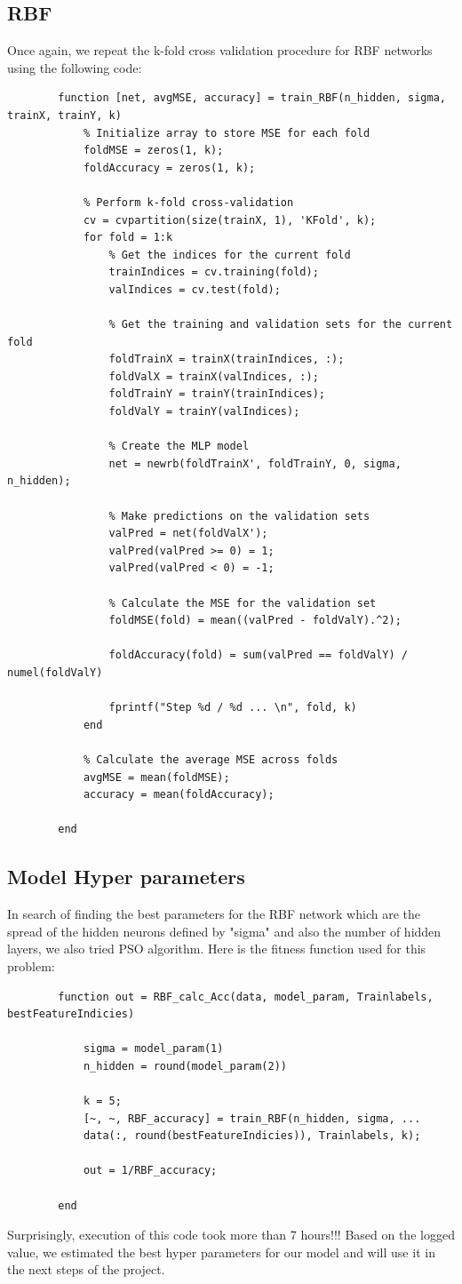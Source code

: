 \documentclass[]{article}
\begin{document}
	\subsection{RBF}
	Once again, we repeat the k-fold cross validation procedure for RBF networks using the following code:
	\begin{lstlisting}
		function [net, avgMSE, accuracy] = train_RBF(n_hidden, sigma, trainX, trainY, k)
			% Initialize array to store MSE for each fold
			foldMSE = zeros(1, k);
			foldAccuracy = zeros(1, k);
			
			% Perform k-fold cross-validation
			cv = cvpartition(size(trainX, 1), 'KFold', k);
			for fold = 1:k
				% Get the indices for the current fold
				trainIndices = cv.training(fold);
				valIndices = cv.test(fold);
				
				% Get the training and validation sets for the current fold
				foldTrainX = trainX(trainIndices, :);
				foldValX = trainX(valIndices, :);
				foldTrainY = trainY(trainIndices);
				foldValY = trainY(valIndices);
				
				% Create the MLP model
				net = newrb(foldTrainX', foldTrainY, 0, sigma, n_hidden);
				
				% Make predictions on the validation sets
				valPred = net(foldValX');
				valPred(valPred >= 0) = 1;
				valPred(valPred < 0) = -1;
				
				% Calculate the MSE for the validation set
				foldMSE(fold) = mean((valPred - foldValY).^2);
				
				foldAccuracy(fold) = sum(valPred == foldValY) / numel(foldValY)
				
				fprintf("Step %d / %d ... \n", fold, k)
			end
			
			% Calculate the average MSE across folds
			avgMSE = mean(foldMSE);
			accuracy = mean(foldAccuracy);
			
		end
	\end{lstlisting}

	\subsection{Model Hyper parameters}
	In search of finding the best parameters for the RBF network which are the spread of the hidden neurons defined by "sigma" and also the number of hidden layers, we also tried PSO algorithm. Here is the fitness function used for this problem:
	\begin{lstlisting}
		function out = RBF_calc_Acc(data, model_param, Trainlabels, bestFeatureIndicies)
		
			sigma = model_param(1)
			n_hidden = round(model_param(2))
			
			k = 5;
			[~, ~, RBF_accuracy] = train_RBF(n_hidden, sigma, ...
			data(:, round(bestFeatureIndicies)), Trainlabels, k);
			
			out = 1/RBF_accuracy;
			
		end
	\end{lstlisting}
	Surprisingly, execution of this code took more than 7 hours!!! Based on the logged value, we estimated the best hyper parameters for our model and will use it in the next steps of the project.
	
\end{document}
